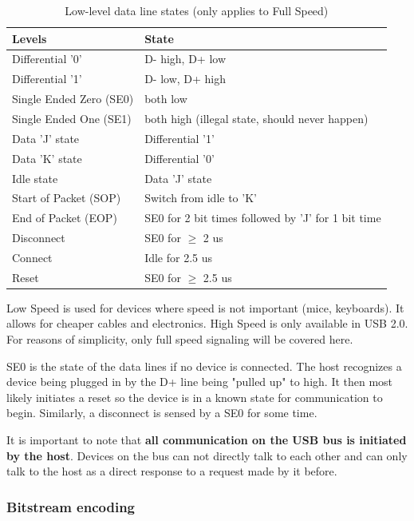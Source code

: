 \documentclass{article}
\begin{document}
\begin{table}[!htbp]
  \caption{Low-level data line states (only applies to Full Speed)}
  \centering
  \begin{tabular}{l | l}
    Levels & State \\ \hline
    Differential '0' & D- high, D+ low \\
    Differential '1' & D- low, D+ high \\
    Single Ended Zero (SE0) & both low \\
    Single Ended One (SE1) & both high (illegal state, should never happen) \\
    Data 'J' state & Differential '1' \\
    Data 'K' state & Differential '0' \\
    Idle state & Data 'J' state \\
    Start of Packet (SOP) & Switch from idle to 'K' \\
    End of Packet (EOP) & SE0 for 2 bit times followed by 'J' for 1 bit time \\
    Disconnect & SE0 for $\geq$ 2 us \\
    Connect & Idle for 2.5 us \\
    Reset & SE0 for $\geq$ 2.5 us \\
  \end{tabular}
\end{table}

\pagebreak
Low Speed is used for devices where speed is not important (mice, keyboards).
It allows for cheaper cables and electronics. High Speed is only available
in USB 2.0. For reasons of simplicity, only full speed signaling will be covered
here.

SE0 is the state of the data lines if no device is connected. The host
recognizes a device being plugged in by the D+ line being "pulled up" to high.
It then most likely initiates a reset so the device is in a known state for
communication to begin. Similarly, a disconnect is sensed by a SE0 for some time.

It is important to note that {\bf all communication on the USB bus is initiated by the
host}. Devices on the bus can not directly talk to each other and can only talk
to the host as a direct response to a request made by it before.

\subsubsection{Bitstream encoding}
\end{document}

